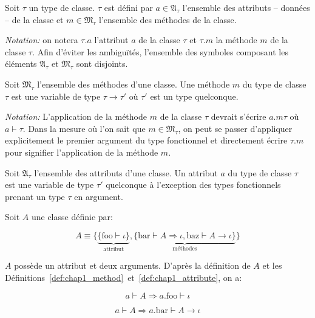 \begin{mydef}\label{def:chap1_class}
  Soit $\tau$ un type de classe. $\tau$ est défini par $a \in \mathfrak{A}_\tau$
  l'ensemble des attributs -- données -- de la classe et $m \in
  \mathfrak{M}_\tau$ l'ensemble des méthodes de la classe.

  \emph{Notation:} on notera $\tau.a$ l'attribut $a$ de la classe $\tau$ et
  $\tau.m$ la méthode $m$ de la classe $\tau$. Afin d'éviter les ambiguïtés,
  l'ensemble des symboles composant les éléments $\mathfrak{A}_\tau$ et
  $\mathfrak{M}_\tau$ sont disjoints.
\end{mydef}

\begin{mydef}\label{def:chap1_method}
  Soit $\mathfrak{M}_\tau$ l'ensemble des méthodes d'une classe. Une
  méthode $m$ du type de classe $\tau$ est une variable de type $\tau
  \rightarrow \tau'$ où $\tau'$ est un type quelconque.

  \emph{Notation:} L'application de la méthode $m$ de la classe $\tau$
  devrait s'écrire $a.m \tau$ où $a \vdash \tau$. Dans la mesure où
  l'on sait que $m \in \mathfrak{M}_\tau$, on peut se passer
  d'appliquer explicitement le premier argument du type fonctionnel et
  directement écrire $\tau.m$ pour signifier l'application de la
  méthode $m$.
\end{mydef}

\begin{mydef}\label{def:chap1_attribute}
  Soit $\mathfrak{A}_\tau$ l'ensemble des attributs d'une classe. Un
  attribut $a$ du type de classe $\tau$ est une variable de type
  $\tau'$ quelconque à l'exception des types fonctionnels prenant un
  type $\tau$ en argument.
\end{mydef}


\begin{myexample}\label{ex:chap1_class}
  Soit $A$ une classe définie par:

  \begin{equation}
    A \equiv \{ \underbrace{\{ \text{foo} \vdash \iota
      \}}_{\text{attribut}}, \underbrace{\{ \text{bar} \vdash A
      \Rightarrow \iota, \text{baz} \vdash A \rightarrow \iota
      \}}_{\text{méthodes}} \}
  \end{equation}

  $A$ possède un attribut et deux arguments. D'après la définition de
  $A$ et les
  Définitions \ref{def:chap1_method} et \ref{def:chap1_attribute}, on
  a:

  \begin{equation}
    a \vdash A \Rightarrow a.\text{foo} \vdash \iota
  \end{equation}

  \begin{equation}
    a \vdash A \Rightarrow a.\text{bar} \vdash A \rightarrow \iota
  \end{equation}
\end{myexample}


